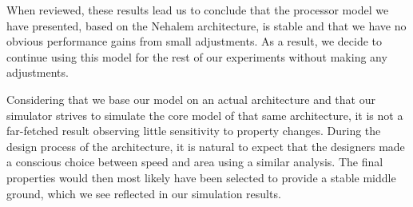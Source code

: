 When reviewed, these results lead us to conclude that the processor model we have presented, based on the Nehalem architecture, is stable and that we have no obvious performance gains from small adjustments.
As a result, we decide to continue using this model for the rest of our experiments without making any adjustments.

Considering that we base our model on an actual architecture and that our simulator strives to simulate the core model of that same architecture, it is not a far-fetched result observing little sensitivity to property changes.
During the design process of the architecture, it is natural to expect that the designers made a conscious choice between speed and area using a similar analysis.
The final properties would then most likely have been selected to provide a stable middle ground, which we see reflected in our simulation results.